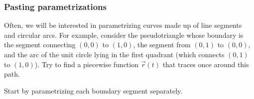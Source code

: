 \documentclass[11pt,ignorenonframetext,]{beamer}
\begin{document}
\begin{frame}\frametitle{Pasting parametrizations}

Often, we will be interested in parametrizing curves made up of line
segments and circular arcs. For example, consider the pseudotriangle
whose boundary is the segment connecting $(0,0)$ to $(1,0)$, the segment
from $(0,1)$ to $(0,0)$, and the arc of the unit circle lying in the
first quadrant (which connects $(0,1)$ to $(1,0)$). Try to find a
piecewise function $\vec{r}(t)$ that traces once around this path.

Start by parametrizing each boundary segment separately.

\end{frame}
\end{document}
